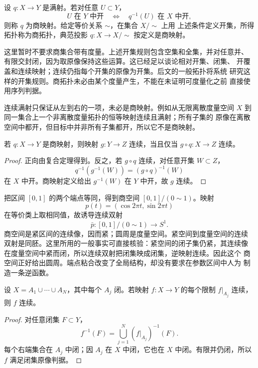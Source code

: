 \begin{definition}[商映射]
设 \(q:X\to Y\) 是满射。若对任意 \(U\subset Y\)，
\[
 U\text{ 在 }Y\text{ 中开}
 \quad\Longleftrightarrow\quad
 q^{-1}(U)\text{ 在 }X\text{ 中开},
\]
则称 \(q\) 为商映射。给定等价关系 \(\sim\)，在集合 \(X/{\sim}\) 上用
上述条件定义开集，所得拓扑称为商拓扑，典范投影
\(q:X\to X/{\sim}\) 按定义是商映射。
\end{definition}

这里暂时不要求商集合带有度量。上述开集规则包含空集和全集，并对任意并、
有限交封闭，因为取原像保持这些运算。这已经足以谈论相对开集、闭集、
开覆盖和连续映射；连续仍指每个开集的原像为开集。后文的一般拓扑将系统
研究这样的开集规则。商拓扑未必由某个度量产生，不能在未证明可度量化之前
直接使用序列判据。

连续满射只保证从左到右的一项，未必是商映射。例如从无限离散度量空间
\(X\) 到同一集合上一个非离散度量拓扑的恒等映射连续且满射；所有子集的
原像在离散空间中都开，但目标中并非所有子集都开，所以它不是商映射。

\begin{proposition}[商映射的连续性判据]
\label{prop:quotient-map-continuity-test}
若 \(q:X\to Y\) 是商映射，则映射 \(g:Y\to Z\) 连续，当且仅当
\(g\circ q:X\to Z\) 连续。
\end{proposition}

\begin{proof}
正向由复合定理得到。反之，若 \(g\circ q\) 连续，对任意开集
\(W\subset Z\)，
\[
 q^{-1}(g^{-1}(W))=(g\circ q)^{-1}(W)
\]
在 \(X\) 中开。商映射定义给出 \(g^{-1}(W)\) 在 \(Y\) 中开，故 \(g\)
连续。
\end{proof}

把区间 \([0,1]\) 的两个端点等同，得到商空间
\([0,1]/(0\sim1)\)。映射
\[
 p(t)=(\cos2\pi t,\sin2\pi t)
\]
在等价类上取相同值，故诱导连续双射
\[
 \bar p:[0,1]/(0\sim1)\longrightarrow S^1.
\]
商空间是紧区间的连续像，因而紧；圆周是度量空间。紧空间到度量空间的连续
双射是同胚。这里所用的一般事实可直接核验：紧空间的闭子集仍紧，其连续像
在度量空间中紧而闭，所以连续双射把闭集映成闭集，逆映射连续。因此这个
商空间正好给出圆周。端点粘合改变了全局结构，却没有要求在参数区间中人为
制造一条逆函数。

\begin{theorem}[有限闭集粘合引理]
\label{thm:finite-closed-pasting}
设 \(X=A_1\cup\cdots\cup A_N\)，其中每个 \(A_j\) 闭。若映射
\(f:X\to Y\) 的每个限制 \(f|_{A_j}\) 连续，则 \(f\) 连续。
\end{theorem}

\begin{proof}
对任意闭集 \(F\subset Y\)，
\[
 f^{-1}(F)=\bigcup_{j=1}^N(f|_{A_j})^{-1}(F).
\]
每个右端集合在 \(A_j\) 中闭；因 \(A_j\) 在 \(X\) 中闭，它也在 \(X\)
中闭。有限并仍闭，所以 \(f\) 满足闭集原像判据。
\end{proof}

